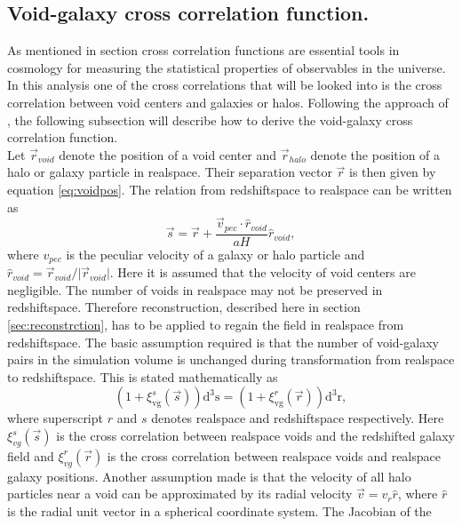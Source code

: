 \subsection{Void-galaxy cross correlation function.}
As mentioned in section  cross correlation functions are
essential tools in cosmology for measuring the statistical properties of
observables in the universe. In this analysis one of the cross correlations that
will be looked into is the cross correlation between void centers and galaxies
or halos. Following the approach of \cite{Nadathur_corr}, the following
subsection will describe how to derive the void-galaxy cross correlation
function. 
\\\indent
Let $\vec{r}_{void}$ denote the position of a void center and $\vec{r}_{halo}$ denote the
position of a halo or galaxy particle in realspace. Their separation vector $\vec{r}$ is then
given by equation \ref{eq:voidpos}. The relation from redshiftspace to realspace
can be written as
\begin{equation}
    \vec{s}=\vec{r}+\frac{\vec{v}_{pec}\cdot\hat{r}_{void}}{aH}\hat{r}_{void},
\end{equation}
where $v_{pec}$ is the peculiar velocity of a galaxy or halo particle and
$\hat{r}_{void}=\vec{r}_{void}/ \vert \vec{r}_{void}\vert$. Here it is assumed
that the velocity of void centers are negligible. The number of voids in
realspace may not be preserved in redshiftspace. Therefore reconstruction,
described here in section \ref{sec:reconstrction}, has to be applied to regain
the field in realspace from redshiftspace. The basic assumption
required is that the number of void-galaxy pairs in the simulation volume is
unchanged during transformation from realspace to redshiftspace. This is stated
mathematically as
\begin{equation}
    (1 + \xi^s_{\mathrm{vg}}(\vec{s}))\mathrm{d}^3\mathrm{s}=(1 + \xi^r_{\mathrm{vg}}(\vec{r}))\mathrm{d}^3\mathrm{r},
\end{equation}
where superscript $r$ and $s$ denotes realspace and redshiftspace respectively.
Here $\xi^s_{vg}(\vec{s})$ is the cross correlation between realspace voids and
the redshifted galaxy field and $\xi^r_{vg}(\vec{r})$ is the cross correlation
between realspace voids and realspace galaxy positions. Another assumption made
is that the velocity of all halo particles near a void can be approximated by
its radial velocity $\vec{v}=v_r \hat{r}$, where $\hat{r}$ is the radial unit vector
in a spherical coordinate system. The Jacobian of the